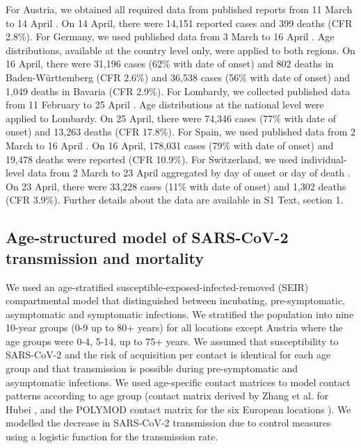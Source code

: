 \documentclass{article}
\begin{document}
For Austria, we obtained all required data from published reports from 11 March to 14 April \cite{BundesministeriumfurSozialesGesundheit}. On 14 April, there were 14,151 reported cases and 399 deaths (CFR 2.8\%). 
For Germany, we used published data from 3 March to 16 April \cite{RobertKochInstitute}. 
Age distributions, available at the country level only, were applied to both regions. 
On 16 April, there were 31,196 cases (62\% with date of onset) and 802 deaths in Baden-Württemberg (CFR 2.6\%) and 36,538 cases (56\% with date of onset) and 1,049 deaths in Bavaria (CFR 2.9\%). 
For Lombardy, we collected published data from 11 February to 25 April \cite{Civile,IstitutoSuperiorediSanita}. 
Age distributions at the national level were applied to Lombardy. 
On 25 April, there were 74,346 cases (77\% with date of onset) and 13,263 deaths (CFR 17.8\%). 
For Spain, we used published data from 2 March to 16 April \cite{MinisteriodeSanidad}. 
On 16 April, 178,031 cases (79\% with date of onset) and 19,478 deaths were reported (CFR 10.9\%).
For Switzerland, we used individual-level data from 2 March to 23 April aggregated by day of onset or day of death \cite{FederalofficeofPublicHealth}. 
On 23 April, there were 33,228 cases (11\% with date of onset) and 1,302 deaths (CFR 3.9\%). 
Further details about the data are available in S1 Text, section 1.


\subsection*{Age-structured model of SARS-CoV-2 transmission and mortality}

We used an age-stratified susceptible-exposed-infected-removed (SEIR) compartmental model that distinguished between incubating, pre-symptomatic, asymptomatic and symptomatic infections. 
We stratified the population into nine 10-year groups (0-9 up to 80+ years) for all locations except Austria where the age groups were 0-4, 5-14, up to 75+ years. 
We assumed that susceptibility to SARS-CoV-2 and the risk of acquisition per contact is identical for each age group and that transmission is possible during pre-symptomatic and asymptomatic infections.
We used age-specific contact matrices to model contact patterns according to age group (contact matrix derived by Zhang et al. for Hubei \cite{zhang2019patterns}, and the POLYMOD contact matrix for the six European locations \cite{Mossong2008}).
We modelled the decrease in SARS-CoV-2 transmission due to control measures using a logistic function for the transmission rate. 
\end{document}
